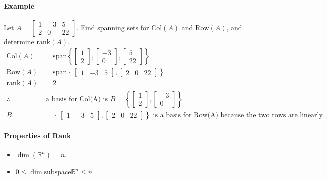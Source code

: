 \paragraph*{Example}
Let $A = \begin{bmatrix}
    1 & -3 & 5 \\ 2 & 0 & 22
\end{bmatrix}$. Find spanning sets for $\mathrm{Col}(A)$ and $\mathrm{Row}(A)$, and determine $\mathrm{rank}(A)$.
\begin{align*}
\mathrm{Col}(A) & = \text{span}\left\{\begin{bmatrix}
    1 \\ 2
\end{bmatrix}, \begin{bmatrix}    -3 \\ 0
\end{bmatrix}, \begin{bmatrix}    5 \\ 22
\end{bmatrix}\right\} \\
\mathrm{Row}(A) & = \text{span}\left\{\begin{bmatrix}
    1 & -3 & 5
\end{bmatrix}, \begin{bmatrix}    
    2 & 0 & 22
\end{bmatrix}\right\} \\
\mathrm{rank}(A) & = 2 \\
\therefore \quad & \text{ a basis for Col(A) is } B = \left\{\begin{bmatrix}
    1 \\ 2
\end{bmatrix}, \begin{bmatrix}    
    -3 \\ 0
\end{bmatrix}\right\}\\
B &= \left\{ \begin{bmatrix}
    1 & -3 & 5
\end{bmatrix}, \begin{bmatrix}    
    2 & 0 & 22
\end{bmatrix}\right\} \text{ is a basis for Row(A) because the two rows are linearly independent.}
\end{align*}

\paragraph*{Properties of Rank}
\begin{itemize}
    \item $\dim(\mathbb{R}^n) = n$.
    \item $0 \leq \dim{\text{subspace}{\mathbb{R}^n}} \leq n$
\end{itemize}

